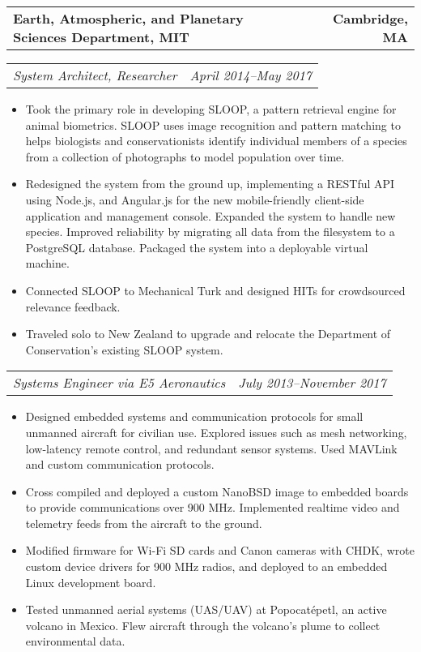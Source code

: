 \documentclass[10pt,letterpaper]{article}
\newcommand{\headerrow}[2]{%
    \begin{tabularx}{\linewidth}{Xr}
	    #1 & #2 \\
    \end{tabularx}
}
\begin{document}
    \headerrow{\textbf{Earth, Atmospheric, and Planetary Sciences Department, MIT}}
        {\textbf{Cambridge, MA}}
    \headerrow{\textit{System Architect, Researcher}}{\textit{April 2014--May 2017}}
    \begin{itemize}[label=--]
        \item Took the primary role in developing SLOOP, a pattern retrieval
            engine for animal biometrics.  SLOOP uses image recognition and
            pattern matching to helps biologists and conservationists identify
            individual members of a species from a collection of photographs to
            model population over time.

        \item Redesigned the system from the ground up, implementing a RESTful
            API using Node.js, and Angular.js for the new mobile-friendly
            client-side application and management console. Expanded the system
            to handle new species.  Improved reliability by migrating all data
            from the filesystem to a PostgreSQL database.  Packaged the system
            into a deployable virtual machine.

        \item Connected SLOOP to Mechanical Turk and designed HITs for
            crowdsourced relevance feedback.

        \item Traveled solo to New Zealand to upgrade and relocate the
            Department of Conservation's existing SLOOP system.
    \end{itemize}

    \headerrow{\textit{Systems Engineer via E5 Aeronautics}}
        {\textit{July 2013--November 2017}}
    \begin{itemize}[label=--]
        \item Designed embedded systems and communication protocols for small
            unmanned aircraft for civilian use.  Explored
            issues such as mesh networking, low-latency remote control, and
            redundant sensor systems.  Used MAVLink and custom communication
            protocols.

        \item Cross compiled and deployed a custom NanoBSD image to embedded
            boards to provide communications over 900 MHz.  Implemented
            realtime video and telemetry feeds from the aircraft to the ground.

        \item Modified firmware for Wi-Fi SD cards and Canon cameras with CHDK,
            wrote custom device drivers for 900 MHz radios, and deployed to an
            embedded Linux development board.

        \item Tested unmanned aerial systems (UAS/UAV) at Popocatépetl, an active
            volcano in Mexico. Flew aircraft through the volcano's plume to
            collect environmental data.
    \end{itemize}
\end{document}
